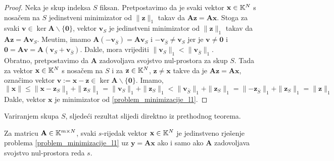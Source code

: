 \documentclass[a4paper,twoside,12pt]{memoir} %
\newcommand{\vect}[1]{\mathbf{#1}}
\renewcommand{\vec}{\vect}
\newcommand{\norm}[1]{\|{#1}\|}
\begin{document}
\begin{proof}
    Neka je skup indeksa $S$ fiksan. Pretpostavimo da je svaki vektor $\vec x \in \K^N$ s nosa\v{c}em na $S$ jedinstveni minimizator od $\norm{\vec z}_1$ takav da $\vec {Az} = \vec {Ax}$. Stoga za svaki $\vec v \in \ker \vec A \backslash \{\vec 0\}$, vektor $\vec v_S$ je jedinstveni minimizator od $\norm{\vec z}_1$ takav da $\vec{Az} = \vec{Av}_S$. Me\dj utim, imamo $\vec A (-\vec v_{\bar S}) = \vec A \vec v_S$ i $-\vec v_{\bar S} \neq \vec v_S$ jer je $\vec v \neq \vec 0$ i $ \vec 0 = \vec{Av} = \vec A (\vec v_S + \vec v_{\bar S})$. Dakle, mora vrijediti $\norm{\vec v_S}_1 < \norm{\vec v_{\bar S}}_1$.\\
\indent
Obratno, pretpostavimo da $\vec A$ zadovoljava svojstvo nul-prostora za skup $S$. Tada za vektor $\vec x \in \K^N$ s nosa\v{c}em na $S$ i za $\vec z \in \K^N$, $\vec z \neq \vec x$ takve da je $\vec{Az}=\vec{Ax}$, ozna\v{c}imo vektor $\vec v := \vec x - \vec z \in \ker \vec A \backslash \{\vec 0\}$. Imamo,
\begin{equation*}
    \norm{\vec x} \leq \norm{\vec x - \vec z_S}_1 + \norm{\vec z_S}_1 = \norm{\vec v_S}_1 + \norm{\vec z_S}_1 < \norm{\vec v_{\bar S}}_1 + \norm{\vec z_S}_1 = \norm{- \vec z_{\bar S}}_1 + \norm{\vec z_S}_1 = \norm{\vec z}_1
\end{equation*}
Dakle, vektor $\vec x$ je minimizator od \eqref{problem_minimizacije_l1}.
\end{proof}

\indent
Variranjem skupa $S$, sljede\'ci rezultat slijedi direktno iz prethodnog teorema. 

\begin{thm}\label{svojstvo_nul_prostora_tm}
    Za matricu $\vec A \in \K^{m \times N}$, svaki $s$-rijedak vektor $\vec x \in \K^N$ je jedinstveno rje\v{s}enje problema \eqref{problem_minimizacije_l1} uz $\vec y = \vec{Ax}$ ako i samo ako $\vec A$ zadovoljava svojstvo nul-prostora reda $s$.
\end{thm}
\end{document}

